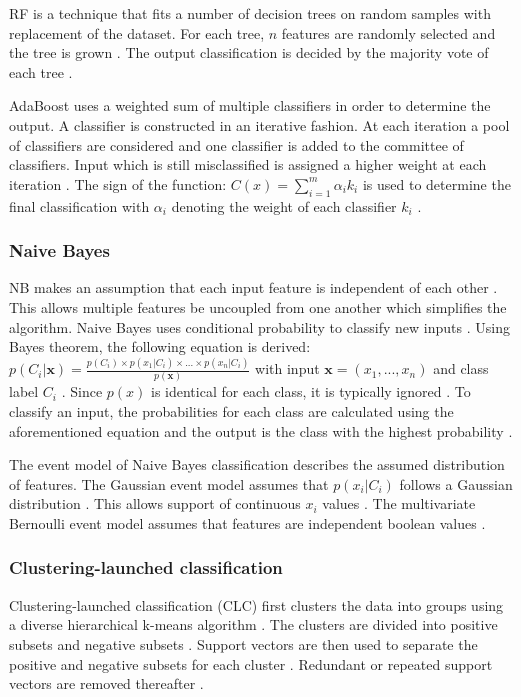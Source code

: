 \documentclass{sig-alternate-05-2015}
\begin{document}
	RF is a technique that fits a number of decision trees on random samples with replacement of the dataset. For each tree, $n$ features are randomly selected and the tree is grown \cite{WIDM:WIDM1072}. The output classification is decided by the majority vote of each tree \cite{WIDM:WIDM1072}.
	
	AdaBoost \cite{FREUND1997119} uses a weighted sum of multiple classifiers in order to determine the output. A classifier is constructed in an iterative fashion. At each iteration a pool of classifiers are considered and one classifier is added to the committee of classifiers. Input which is still misclassified is assigned a higher weight at each iteration \cite{Bergstra2006, rojas2009adaboost}. The sign of the function: $C(x) = \sum_{i=1}^{m} \alpha_i k_i$ is used to determine the final classification with $\alpha_i$ denoting the weight of each classifier $k_i$ \cite{Bergstra2006}. 
	
	\subsubsection{Naive Bayes}
	NB makes an assumption that each input feature is independent of each other \cite{Lewis1998, rish2001empirical}. This allows multiple features be uncoupled from one another which simplifies the algorithm. Naive Bayes uses conditional probability to classify new inputs \cite{Lewis1998}. Using Bayes theorem, the following equation is derived: $p(C_i|\textbf{x}) = \frac{p(C_i) \times p(x_1|C_i) \times...\times p(x_n|C_i)}{p(\textbf{x})}$ with input $\textbf{x} = (x_1,...,x_n)$ and class label $C_i$ \cite{Lewis1998, rish2001empirical}. Since $p(\textit{x})$ is identical for each class, it is typically ignored \cite{rish2001empirical}. To classify an input, the probabilities for each class are calculated using the aforementioned equation and the output is the class with the highest probability \cite{Lewis1998}.
	
	The event model of Naive Bayes classification describes the assumed distribution of features. The Gaussian event model assumes that $p(x_i|C_i)$ follows a Gaussian distribution \cite{John:1995:ECD:2074158.2074196}. This allows support of continuous $x_i$ values \cite{John:1995:ECD:2074158.2074196}. The multivariate Bernoulli event model assumes that features are independent boolean values \cite{mccallum1998comparison}.
	
	\subsubsection{Clustering-launched classification}
	Clustering-launched classification (CLC) first clusters the data into groups using a diverse hierarchical k-means algorithm \cite{Luo20097562}. The clusters are divided into positive subsets and negative subsets \cite{Luo20097562}. Support vectors are then used to separate the positive and negative subsets for each cluster \cite{Luo20097562}. Redundant or repeated support vectors are removed thereafter \cite{Luo20097562}.
	
\end{document}
